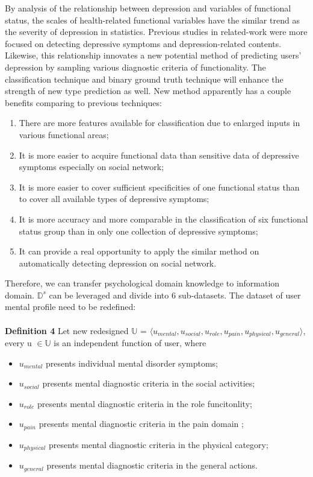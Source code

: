 \documentclass[12pt]{article}
\begin{document}
By analysis of the relationship between depression and variables of functional status, the scales of health-related functional variables have the similar trend as the severity of depression in statistics. Previous studies in related-work were more focused on detecting depressive symptoms and depression-related contents. Likewise, this relationship innovates a new potential method of predicting users' depression by sampling various diagnostic criteria of functionality. The classification technique and binary ground truth technique will enhance the strength of new type prediction as well. New method apparently has a couple benefits comparing to previous techniques:
\begin{enumerate}[label=\alph*)]
  \item There are more features available for classification due to enlarged inputs in various functional areas;
  \item It is more easier to acquire functional data than sensitive data of depressive symptoms especially on social network; 
  \item It is more easier to cover sufficient specificities of one functional status than to cover all available types of depressive symptoms;
  \item It is more accuracy and more comparable in the classification of six functional status group than in only one collection of depressive symptoms;
  \item It can provide a real opportunity to apply the similar method on automatically detecting depression on social network.
\end{enumerate}

Therefore, we can transfer psychological domain knowledge to information domain. \textit{$\mathbb{D}^s$} can be leveraged and divide into 6 sub-datasets. The dataset of user mental profile need to be redefined:\\
\\
\textbf{Definition 4} Let new redesigned $\mathbb{U}$ = $\langle u_{mental}, u_{social}, u_{role}, u_{pain}, u_{physical}, u_{general} \rangle$, every u  $\in \mathbb{U}$ is an independent function of user, where
\begin{itemize}
  \item $u_{mental}$ presents individual mental disorder symptoms;
  \item $u_{social}$ presents mental diagnostic criteria in the social activities;
  \item $u_{role}$ presents mental diagnostic criteria in the role funcitonlity;
  \item $u_{pain}$ presents mental diagnostic criteria in the pain domain ;
  \item $u_{physical}$ presents mental diagnostic criteria in the physical category;
  \item $u_{general}$ presents mental diagnostic criteria in the general actions.
\end{itemize}
\medskip
\end{document}
